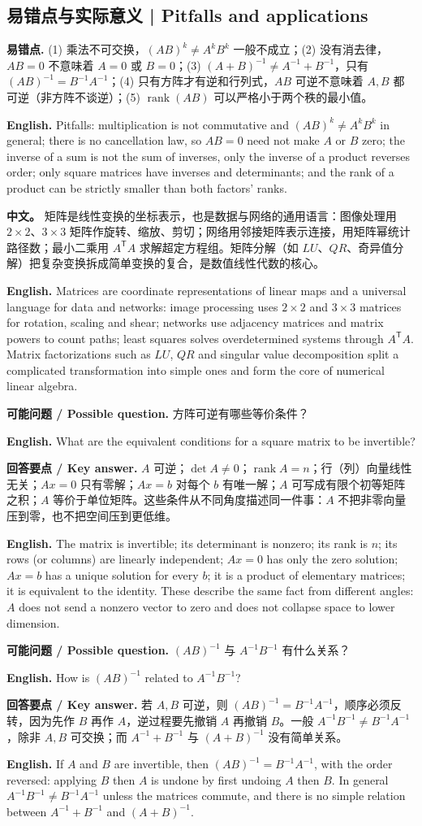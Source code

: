 \documentclass[UTF8,11pt,a4paper]{ctexart}
\newcommand{\EN}[1]{\par\noindent\textbf{English.} #1\par}
\newcommand{\ASK}[4]{\par\noindent\textbf{可能问题 / Possible question.} #1\par\EN{#2}\noindent\textbf{回答要点 / Key answer.} #3\par\EN{#4}\medskip}
\newcommand{\APS}[2]{\par\noindent\textbf{中文。} #1\par\noindent\textbf{English.} #2\par\smallskip}
\begin{document}
\subsection{易错点与实际意义 | Pitfalls and applications}
\noindent\textbf{易错点.} (1) 乘法不可交换，$(AB)^k\ne A^kB^k$ 一般不成立；(2) 没有消去律，$AB=0$ 不意味着 $A=0$ 或 $B=0$；(3) $(A+B)^{-1}\ne A^{-1}+B^{-1}$，只有 $(AB)^{-1}=B^{-1}A^{-1}$；(4) 只有方阵才有逆和行列式，$AB$ 可逆不意味着 $A,B$ 都可逆（非方阵不谈逆）；(5) $\operatorname{rank}(AB)$ 可以严格小于两个秩的最小值。
\EN{Pitfalls: multiplication is not commutative and $(AB)^k\ne A^kB^k$ in general; there is no cancellation law, so $AB=0$ need not make $A$ or $B$ zero; the inverse of a sum is not the sum of inverses, only the inverse of a product reverses order; only square matrices have inverses and determinants; and the rank of a product can be strictly smaller than both factors' ranks.}
\APS{矩阵是线性变换的坐标表示，也是数据与网络的通用语言：图像处理用 $2\times2$、$3\times3$ 矩阵作旋转、缩放、剪切；网络用邻接矩阵表示连接，用矩阵幂统计路径数；最小二乘用 $A^{\mathsf T}A$ 求解超定方程组。矩阵分解（如 $LU$、$QR$、奇异值分解）把复杂变换拆成简单变换的复合，是数值线性代数的核心。}{Matrices are coordinate representations of linear maps and a universal language for data and networks: image processing uses $2\times2$ and $3\times3$ matrices for rotation, scaling and shear; networks use adjacency matrices and matrix powers to count paths; least squares solves overdetermined systems through $A^{\mathsf T}A$. Matrix factorizations such as $LU$, $QR$ and singular value decomposition split a complicated transformation into simple ones and form the core of numerical linear algebra.}
\ASK{方阵可逆有哪些等价条件？}{What are the equivalent conditions for a square matrix to be invertible?}{$A$ 可逆；$\det A\ne0$；$\operatorname{rank}A=n$；行（列）向量线性无关；$Ax=0$ 只有零解；$Ax=b$ 对每个 $b$ 有唯一解；$A$ 可写成有限个初等矩阵之积；$A$ 等价于单位矩阵。这些条件从不同角度描述同一件事：$A$ 不把非零向量压到零，也不把空间压到更低维。}{The matrix is invertible; its determinant is nonzero; its rank is $n$; its rows (or columns) are linearly independent; $Ax=0$ has only the zero solution; $Ax=b$ has a unique solution for every $b$; it is a product of elementary matrices; it is equivalent to the identity. These describe the same fact from different angles: $A$ does not send a nonzero vector to zero and does not collapse space to lower dimension.}
\ASK{$(AB)^{-1}$ 与 $A^{-1}B^{-1}$ 有什么关系？}{How is $(AB)^{-1}$ related to $A^{-1}B^{-1}$?}{若 $A,B$ 可逆，则 $(AB)^{-1}=B^{-1}A^{-1}$，顺序必须反转，因为先作 $B$ 再作 $A$，逆过程要先撤销 $A$ 再撤销 $B$。一般 $A^{-1}B^{-1}\ne B^{-1}A^{-1}$，除非 $A,B$ 可交换；而 $A^{-1}+B^{-1}$ 与 $(A+B)^{-1}$ 没有简单关系。}{If $A$ and $B$ are invertible, then $(AB)^{-1}=B^{-1}A^{-1}$, with the order reversed: applying $B$ then $A$ is undone by first undoing $A$ then $B$. In general $A^{-1}B^{-1}\ne B^{-1}A^{-1}$ unless the matrices commute, and there is no simple relation between $A^{-1}+B^{-1}$ and $(A+B)^{-1}$.}
\end{document}
